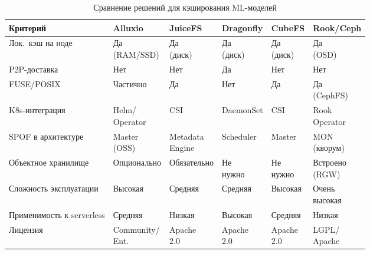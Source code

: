 \begin{table}[htbp]
\centering
\caption{Сравнение решений для кэширования ML-моделей}
\label{tab:solutions_comparison}
\begingroup
\setlength{\tabcolsep}{2.5pt}
\renewcommand{\arraystretch}{1.15}
\scriptsize
\begin{tabularx}{\textwidth}{>{\raggedright\arraybackslash}p{34mm}*{5}{>{\centering\arraybackslash}X}}
\toprule
\textbf{Критерий} & \textbf{Alluxio} & \textbf{JuiceFS} & \textbf{Dragonfly} & \textbf{CubeFS} & \textbf{Rook/Ceph} \\
\midrule
Лок.\ кэш на ноде        & \shortstack{Да\\(RAM/SSD)} & \shortstack{Да\\(диск)} & \shortstack{Да\\(диск)} & \shortstack{Да\\(диск)} & \shortstack{Да\\(OSD)} \\
P2P-доставка              & Нет & Нет & Да & Нет & Нет \\
FUSE/POSIX                & Частично & Да & Нет & Да & \shortstack{Да\\(CephFS)} \\
K8s-интеграция            & \shortstack{Helm/\\Operator} & CSI & DaemonSet & CSI & \shortstack{Rook\\Operator} \\
SPOF в архитектуре        & \shortstack{Master\\(OSS)} & \shortstack{Metadata\\Engine} & Scheduler & Master & \shortstack{MON\\(кворум)} \\
Объектное хранилище       & Опционально & Обязательно & \shortstack{Не\\нужно} & \shortstack{Не\\нужно} & \shortstack{Встроено\\(RGW)} \\
Сложность эксплуатации    & Высокая & Средняя & Средняя & Высокая & \shortstack{Очень\\высокая} \\
Применимость к serverless & Средняя & Низкая & Высокая & Средняя & Низкая \\
Лицензия                  & \shortstack{Community/\\Ent.} & \shortstack{Apache\\2.0} & \shortstack{Apache\\2.0} & \shortstack{Apache\\2.0} & \shortstack{LGPL/\\Apache} \\
\bottomrule
\end{tabularx}
\endgroup
\end{table}

